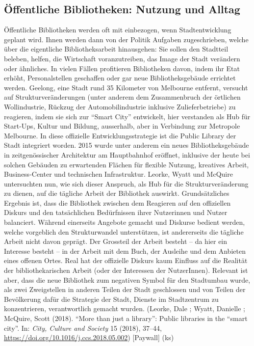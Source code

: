 \documentclass[a4paper,
fontsize=11pt,
oneside,
numbers=noperiodatend,
parskip=half-,
bibliography=totoc,
final
]{scrartcl}
\begin{document}
\hypertarget{uxf6ffentliche-bibliotheken-nutzung-und-alltag}{%
\subsection{Öffentliche Bibliotheken: Nutzung und
Alltag}\label{uxf6ffentliche-bibliotheken-nutzung-und-alltag}}

Öffentliche Bibliotheken werden oft mit einbezogen, wenn
Stadtentwicklung geplant wird. Ihnen werden dann von der Politik
Aufgaben zugeschrieben, welche über die eigentliche Bibliotheksarbeit
hinausgehen: Sie sollen den Stadtteil beleben, helfen, die Wirtschaft
voranzutreiben, das Image der Stadt verändern oder ähnliches. In vielen
Fällen profitieren Bibliotheken davon, indem ihr Etat erhöht,
Personalstellen geschaffen oder gar neue Bibliotheksgebäude errichtet
werden. Geelong, eine Stadt rund 35 Kilometer von Melbourne entfernt,
versucht auf Strukturveränderungen (unter anderem dem Zusammenbruch der
örtlichen Wollindustrie, Rückzug der Automobilindustrie inklusive
Zulieferbetriebe) zu reagieren, indem sie sich zur \enquote{Smart City}
entwickelt, hier verstanden als Hub für Start-Ups, Kultur und Bildung,
ausserhalb, aber in Verbindung zur Metropole Melbourne. In diese
offizielle Entwicklungsstrategie ist die Public Library der Stadt
integriert worden. 2015 wurde unter anderem ein neues Bibliotheksgebäude
in zeitgenössischer Architektur am Hauptbahnhof eröffnet, inklusive der
heute bei solchen Gebäuden zu erwartenden Flächen für flexible Nutzung,
kreatives Arbeit, Business-Center und technischen Infrastruktur. Leorke,
Wyatt und McQuire untersuchten nun, wie sich dieser Anspruch, als Hub
für die Strukturveränderung zu dienen, auf die tägliche Arbeit der
Bibliothek auswirkt. Grundsätzliches Ergebnis ist, dass die Bibliothek
zwischen dem Reagieren auf den offiziellen Diskurs und den tatsächlichen
Bedürfnissen ihrer Nutzerinnen und Nutzer balanciert. Während einerseits
Angebote gemacht und Diskurse bedient werden, welche vorgeblich den
Strukturwandel unterstützen, ist andererseits die tägliche Arbeit nicht
davon geprägt. Der Grossteil der Arbeit besteht -- da hier ein Interesse
besteht -- in der Arbeit mit dem Buch, der Ausleihe und dem Anbieten
eines offenen Ortes. Real hat der offizielle Diskurs kaum Einfluss auf
die Realität der bibliothekarischen Arbeit (oder der Interessen der
NutzerInnen). Relevant ist aber, dass die neue Bibliothek zum negativen
Symbol für den Stadtumbau wurde, als zwei Zweigstellen in anderen Teilen
der Stadt geschlossen und von Teilen der Bevölkerung dafür die Strategie
der Stadt, Dienste im Stadtzentrum zu konzentrieren, verantwortlich
gemacht wurden. (Leorke, Dale ; Wyatt, Danielle ; McQuire, Scott (2018).
\enquote{More than just a library}: Public libraries in the
\enquote{smart city}. In: \emph{City, Culture and Society} 15 (2018),
37--44, \url{https://doi.org/10.1016/j.ccs.2018.05.002}) {[}Paywall{]}
(ks)
\end{document}
